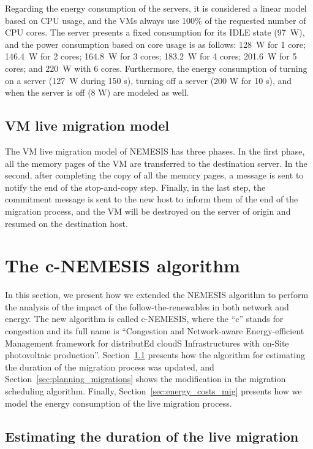 Regarding the energy consumption of the servers, it is considered a linear model based on CPU usage, and the VMs always use 100\% of the requested number of CPU cores. The server presents a fixed consumption for its IDLE state (97~W), and the power consumption based on core usage is as follows: 128~W for 1 core; 146.4~W for 2 cores; 164.8~W for 3 cores; 183.2~W for 4 cores; 201.6~W for 5 cores; and 220~W with 6 cores. Furthermore, the energy consumption of turning on a server (127~W during 150 s), turning off a server (200 W for 10 s), and when the server is off (8 W) are modeled as well. 


\subsection{VM live migration model}

The VM live migration model of NEMESIS has three phases. In the first phase, all the memory pages of the VM are transferred to the destination server. In the second, after completing the copy of all the memory pages, a message is sent to notify the end of the stop-and-copy step. Finally, in the last step, the commitment message is sent to the new host to inform them of the end of the migration process, and the VM will be destroyed on the server of origin and resumed on the destination host.


\section{The c-NEMESIS algorithm}
\label{sec:modeling_smargreens}

In this section, we present how we extended the NEMESIS algorithm to perform the analysis of the impact of the follow-the-renewables in both network and energy. The new algorithm is called c-NEMESIS, where the ``c'' stands for congestion and its full name is ``Congestion and Network-aware Energy-efficient Management framework for distributEd cloudS Infrastructures with on-Site photovoltaic production''. Section~\ref{sec:estimating_mig_duration} presents how the algorithm for estimating the duration of the migration process was updated, and  Section~\ref{sec:planning_migrations} shows the modification in the migration scheduling algorithm. Finally, Section~\ref{sec:energy_costs_mig} presents how we model the energy consumption of the live migration process.


\subsection{Estimating the duration of the live migration}
\label{sec:estimating_mig_duration}

